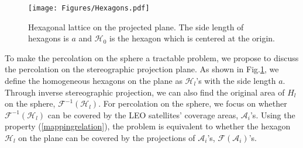 \documentclass[final]{IEEEtran}
\newtheorem{corollary}{Corollary}
\begin{document}
\begin{figure}
    \centering
    \texttt{[image: Figures/Hexagons.pdf]}
    \caption{Hexagonal lattice on the projected plane. The side length of hexagons is $a$ and $\mathcal{H}_0$ is the hexagon which is centered at the origin.}
    \label{fig:hexagon}
\end{figure}
\indent To make the percolation on the sphere a tractable problem, we propose to discuss the percolation on the stereographic projection plane. As shown in Fig.\ref{fig:hexagon}, we define the homogeneous hexagons on the plane as $\mathcal{H}_l$'s with the side length $a$. Through inverse stereographic projection, we can also find the original area of $H_l$ on the sphere, \ie $\mathcal{F}^{-1}(\mathcal{H}_l)$. For percolation on the sphere, we focus on whether $\mathcal{F}^{-1}(\mathcal{H}_l)$ can be covered by the LEO satellites' coverage areas, \ie $\mathcal{A}_i$'s. Using the property (\ref{mappingrelation}), the problem is equivalent to whether the hexagon $\mathcal{H}_l$ on the plane can be covered by the projections of $\mathcal{A}_i$'s, \ie $\mathcal{F}(\mathcal{A}_i)$'s.
\end{document}
